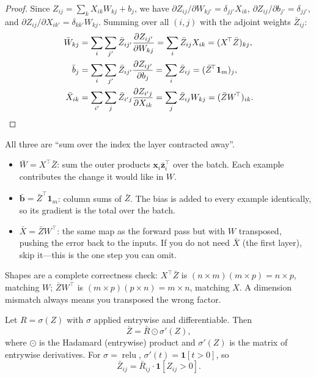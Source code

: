 \begin{proof}
Since $Z_{ij}=\sum_{k}X_{ik}W_{kj}+b_j$, we have
$\partial Z_{ij}/\partial W_{kj'}=\delta_{jj'}X_{ik}$,
$\partial Z_{ij}/\partial b_{j'}=\delta_{jj'}$, and
$\partial Z_{ij}/\partial X_{ik'}=\delta_{kk'}W_{kj}$. Summing over all
$(i,j)$ with the adjoint weights $\bar Z_{ij}$:
\begin{align*}
  \bar W_{kj}
  &=\sum_{i}\sum_{j'}\bar Z_{ij'}\frac{\partial Z_{ij'}}{\partial W_{kj}}
   =\sum_{i}\bar Z_{ij}X_{ik}=(X^{\!\top}\bar Z)_{kj},\\
  \bar b_{j}
  &=\sum_{i}\sum_{j'}\bar Z_{ij'}\frac{\partial Z_{ij'}}{\partial b_{j}}
   =\sum_{i}\bar Z_{ij}=(\bar Z^{\!\top}\mathbf{1}_m)_{j},\\
  \bar X_{ik}
  &=\sum_{i'}\sum_{j}\bar Z_{i'j}\frac{\partial Z_{i'j}}{\partial X_{ik}}
   =\sum_{j}\bar Z_{ij}W_{kj}=(\bar Z W^{\!\top})_{ik}. \qedhere
\end{align*}
\end{proof}

\begin{remark}
All three are ``sum over the index the layer contracted away''.
\begin{itemize}
  \item $\bar W=X^{\!\top}\bar Z$: sum the outer products $\mathbf{x}_i\bar{\mathbf{z}}_i^{\!\top}$
    over the batch. Each example contributes the change it would like in $W$.
  \item $\bar{\mathbf b}=\bar Z^{\!\top}\mathbf{1}_m$: column sums of $\bar Z$. The
    bias is added to every example identically, so its gradient is the total
    over the batch.
  \item $\bar X=\bar ZW^{\!\top}$: the same map as the forward pass but with $W$
    transposed, pushing the error back to the inputs. If you do not need
    $\bar X$ (the first layer), skip it---this is the one step you can omit.
\end{itemize}
Shapes are a complete correctness check: $X^{\!\top}\bar Z$ is
$(n\times m)(m\times p)=n\times p$, matching $W$; $\bar ZW^{\!\top}$ is
$(m\times p)(p\times n)=m\times n$, matching $X$. A dimension mismatch always
means you transposed the wrong factor.
\end{remark}

\begin{theorem}\label{thm:relu-backprop}
Let $R=\sigma(Z)$ with $\sigma$ applied entrywise and differentiable. Then
\[
  \bar Z=\bar R\odot\sigma'(Z),
\]
where $\odot$ is the Hadamard (entrywise) product and $\sigma'(Z)$ is the matrix
of entrywise derivatives. For $\sigma=\operatorname{relu}$,
$\sigma'(t)=\mathbf{1}[t>0]$, so
\[
  \bar Z_{ij}=\bar R_{ij}\cdot\mathbf{1}[Z_{ij}>0].
\]
\end{theorem}

